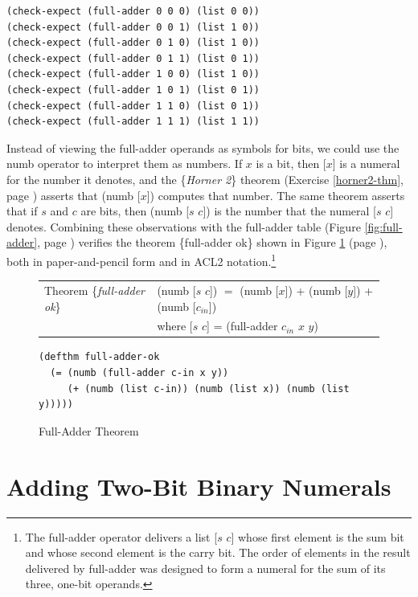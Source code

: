 \label{full-adder-model-check}
\begin{Verbatim}
(check-expect (full-adder 0 0 0) (list 0 0))
(check-expect (full-adder 0 0 1) (list 1 0))
(check-expect (full-adder 0 1 0) (list 1 0))
(check-expect (full-adder 0 1 1) (list 0 1))
(check-expect (full-adder 1 0 0) (list 1 0))
(check-expect (full-adder 1 0 1) (list 0 1))
(check-expect (full-adder 1 1 0) (list 0 1))
(check-expect (full-adder 1 1 1) (list 1 1))
\end{Verbatim}

Instead of viewing the full-adder operands
as symbols for bits, we could use the numb operator
to interpret them as numbers.
If $x$ is a bit, then [$x$] is a numeral for
the number it denotes, and the \{\emph{Horner 2}\} theorem
(Exercise \ref{horner2-thm}, page \pageref{horner2-thm})
asserts that (numb [$x$]) computes that number.
The same theorem asserts that if $s$ and $c$ are bits,
then (numb [$s$ $c$]) is  the number that the numeral [$s$ $c$] denotes.
Combining these observations with the full-adder table
(Figure \ref{fig:full-adder}, page \pageref{fig:full-adder})
verifies the theorem \{full-adder ok\} shown in
Figure \ref{fig:full-adder-thm} (page \pageref{fig:full-adder-thm}),
both in paper-and-pencil form and in ACL2 notation.\footnote{The
full-adder operator delivers a list [$s$ $c$] whose first
element is the sum bit and whose second element is the carry bit.
The order of elements in the result delivered by full-adder was designed
to form a numeral for the sum of its three, one-bit operands.}

\begin{figure}
\begin{center}
\begin{tabular}{ll}
Theorem \{\emph{full-adder ok}\} & (numb [$s$ $c$]) $=$ (numb [$x$]) + (numb [$y$]) + (numb [$c_{in}$]) \\
                                 & where [$s$ $c$] = (full-adder $c_{in}$ $x$ $y$) \\
\end{tabular}
\begin{Verbatim}
(defthm full-adder-ok
  (= (numb (full-adder c-in x y))
     (+ (numb (list c-in)) (numb (list x)) (numb (list y)))))
\end{Verbatim}
\end{center}
\caption{Full-Adder Theorem}
\label{fig:full-adder-thm}
\end{figure}

\section{Adding Two-Bit Binary Numerals}
\label{sec:adding-2-bit-numerals}

